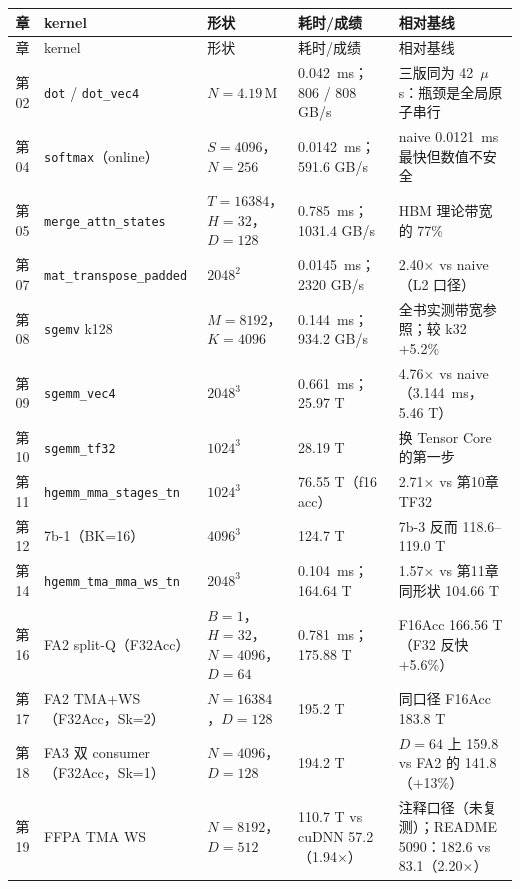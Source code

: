 \begingroup\small
\begin{longtable}{cp{4.3cm}p{2.9cm}p{2.7cm}p{3.4cm}}
\toprule
章 & kernel & 形状 & 耗时/成绩 & 相对基线 \\
\midrule
\endfirsthead
\toprule
章 & kernel & 形状 & 耗时/成绩 & 相对基线 \\
\midrule
\endhead
\endfoot
\bottomrule
\endlastfoot
第02 & \texttt{dot} / \texttt{dot\_vec4} & $N{=}4.19\,$M & 0.042~ms；806 / 808 GB/s & 三版同为 42~$\mu$s：瓶颈是全局原子串行 \\
第04 & \texttt{softmax}（online） & $S{=}4096$，$N{=}256$ & 0.0142~ms；591.6 GB/s & naive 0.0121~ms 最快但数值不安全 \\
第05 & \texttt{merge\_\allowbreak{}attn\_\allowbreak{}states} & $T{=}16384$，$H{=}32$，$D{=}128$ & 0.785~ms；1031.4 GB/s & HBM 理论带宽的 77\% \\
第07 & \texttt{mat\_\allowbreak{}transpose\_\allowbreak{}padded} & $2048^2$ & 0.0145~ms；2320 GB/s & 2.40$\times$ vs naive（L2 口径） \\
第08 & \texttt{sgemv} k128 & $M{=}8192$，$K{=}4096$ & 0.144~ms；934.2 GB/s & 全书实测带宽参照；较 k32 +5.2\% \\
第09 & \texttt{sgemm\_vec4} & $2048^3$ & 0.661~ms；25.97 T & 4.76$\times$ vs naive（3.144~ms，5.46 T） \\
第10 & \texttt{sgemm\_tf32} & $1024^3$ & 28.19 T & 换 Tensor Core 的第一步 \\
第11 & \texttt{hgemm\_\allowbreak{}mma\_\allowbreak{}stages\_\allowbreak{}tn} & $1024^3$ & 76.55 T（f16 acc） & 2.71$\times$ vs 第10章 TF32 \\
第12 & 7b-1（BK=16） & $4096^3$ & 124.7 T & 7b-3 反而 118.6--119.0 T \\
第14 & \texttt{hgemm\_\allowbreak{}tma\_\allowbreak{}mma\_\allowbreak{}ws\_\allowbreak{}tn} & $2048^3$ & 0.104~ms；164.64 T & 1.57$\times$ vs 第11章同形状 104.66 T \\
第16 & FA2 split-Q（F32Acc） & $B{=}1$，$H{=}32$，$N{=}4096$，$D{=}64$ & 0.781~ms；175.88 T & F16Acc 166.56 T（F32 反快 +5.6\%） \\
第17 & FA2 TMA+WS（F32Acc，Sk=2） & $N{=}16384$，$D{=}128$ & 195.2 T & 同口径 F16Acc 183.8 T \\
第18 & FA3 双 consumer（F32Acc，Sk=1） & $N{=}4096$，$D{=}128$ & 194.2 T & $D{=}64$ 上 159.8 vs FA2 的 141.8（+13\%） \\
第19 & FFPA TMA WS & $N{=}8192$，$D{=}512$ & 110.7 T vs cuDNN 57.2（1.94$\times$） & 注释口径（未复测）；README 5090：182.6 vs 83.1（2.20$\times$） \\
\end{longtable}
\endgroup


